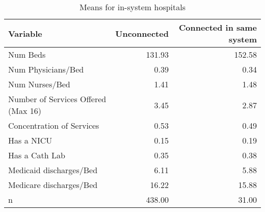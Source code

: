 \begin{table}

\caption{Means for in-system hospitals}
\centering
\begin{tabular}[t]{l|r|r}
\hline
Variable & Unconnected & Connected in same system\\
\hline
Num Beds & 131.93 & 152.58\\
\hline
Num Physicians/Bed & 0.39 & 0.34\\
\hline
Num Nurses/Bed & 1.41 & 1.48\\
\hline
Number of Services Offered (Max 16) & 3.45 & 2.87\\
\hline
Concentration of Services & 0.53 & 0.49\\
\hline
Has a NICU & 0.15 & 0.19\\
\hline
Has a Cath Lab & 0.35 & 0.38\\
\hline
Medicaid discharges/Bed & 6.11 & 5.88\\
\hline
Medicare discharges/Bed & 16.22 & 15.88\\
\hline
n & 438.00 & 31.00\\
\hline
\end{tabular}
\end{table}
